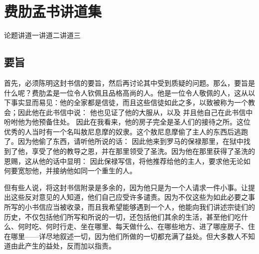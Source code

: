 
\chapter{费肋孟书讲道集}


论题\newline{}讲道一\newline{}讲道二\newline{}讲道三\par



\section{要旨}

首先，必须陈明这封书信的要旨，然后再讨论其中受到质疑的问题。那么，要旨是什么呢？费肋孟是一位令人钦佩且品格高尚的人。他是一位令人敬佩的人，这从以下事实显而易见：他的全家都是信徒，而且这些信徒如此之多，以致被称为一个教会；因此他在此书信中说： 他也见证了他的大服从，以及 并且他自己在此书信中吩咐他为他预备住处。 因此在我看来，他的房子完全是圣人们的接待之所。这位优秀的人当时有一个名叫敖尼息摩的奴隶。这个敖尼息摩偷了主人的东西后逃跑了。因为他偷了东西，请听他所说的话： 因此他来到罗马的保禄那里，在狱中找到了他，享受了他的教导之恩，并在那里领受了圣洗。因为他在那里获得了圣洗的恩赐，这从他的话中显明： 因此保禄写信，将他推荐给他的主人，要求他无论如何要宽恕他，并接纳他如同一个重生的人。\par

但有些人说，将这封书信附录是多余的，因为他只是为一个人请求一件小事。让提出这些反对意见的人知道，他们自己应受许多谴责。因为不仅这些为如此必要之事所写的小书信应当被收录，而且我希望能够遇到一个人，他能向我们讲述宗徒们的历史，不仅包括他们所写和所说的一切，还包括他们其余的生活，甚至他们吃什么、何时吃、何时行走、坐在哪里、每天做什么、在哪些地方、进了哪座房子、住在哪里——详尽地叙述一切，因为他们所做的一切都充满了益处。但大多数人不知道由此产生的益处，反而加以指责。\par

